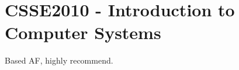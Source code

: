 \hypertarget{CSSE2010}{\section{CSSE2010 - Introduction to Computer Systems}}
Based AF, highly recommend.
